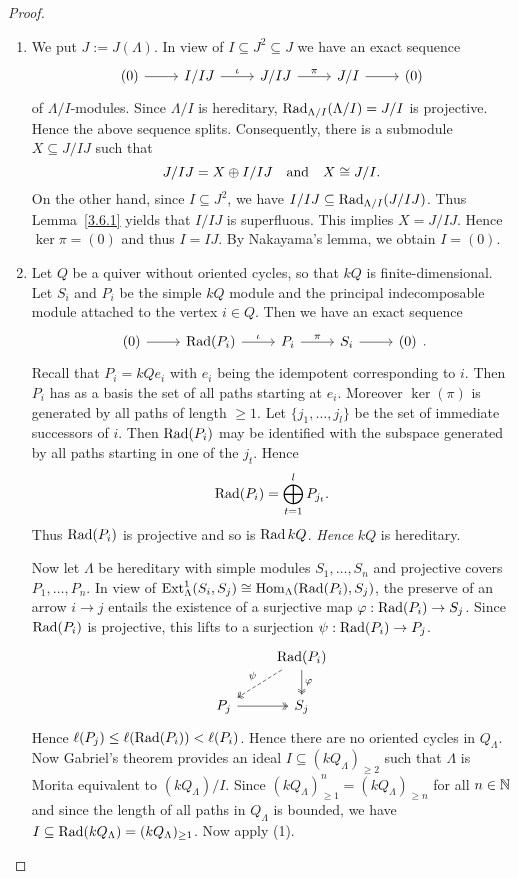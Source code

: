\begin{proof}\
\begin{enumerate}

\item We put $J:=J(\Lambda)$. In view of $I\subseteq J^2\subseteq J$ we have an exact sequence
\[
\begin{tikzcd}
	(0) \ar[r] & I/IJ \ar[r,"\iota"] & J/IJ \ar[r,"\pi"] & J/I \ar[r] & (0)
\end{tikzcd}
\]
of $\Lambda/I$-modules. Since $\Lambda/I$ is hereditary, $\operatorname{Rad}_{\Lambda/I}(\Lambda/I)=J/I$ is projective. Hence the above sequence splits. Consequently, there is a submodule $X\subseteq J/IJ$ such that
\[
J/IJ=X\oplus I/IJ
\quad\text{and}\quad
X\cong J/I.
\]
On the other hand, since $I\subseteq J^2$, we have $I/IJ\subseteq\operatorname{Rad}_{\Lambda/I}(J/IJ)$. Thus Lemma~\ref{3.6.1} yields that $I/IJ$ is superfluous. This implies $X=J/IJ$. Hence $\ker \pi=(0)$ and thus $I=IJ$. By Nakayama's lemma, we obtain $I=(0)$.

\item Let $Q$ be a quiver without oriented cycles, so that $kQ$ is finite-dimensional. Let $S_i$ and $P_i$ be the simple $kQ$ module and the principal indecomposable module attached to the vertex $i\in Q$. Then we have an exact sequence
\[
\begin{tikzcd}
	(0) \ar[r] & \Rad(P_i) \ar[r,"\iota"] & P_i \ar[r,"\pi"] & S_i \ar[r] & (0)
\end{tikzcd}.
\]
Recall that $P_i=kQe_i$ with $e_i$ being the idempotent corresponding to $i$. Then $P_i$ has as a basis the set of all paths starting at $e_i$. Moreover $\ker(\pi)$ is generated by all paths of length $\ge 1$. Let $\{j_1,\dots,j_l\}$ be the set of immediate successors of $i$. Then $\operatorname{Rad}(P_i)$ may be identified with the subspace generated by all paths starting in one of the $j_t$. Hence
\[
\operatorname{Rad}(P_i) = \bigoplus_{t=1}^l P_{j_t}.
\]
Thus $\operatorname{Rad}(P_i)$ is projective and so is $\operatorname{Rad} kQ$. \textit{Hence} $kQ$ is hereditary.

Now let $\Lambda$ be hereditary with simple modules $S_1,\dots,S_n$ and projective covers $P_1,\dots,P_n$. In view of
$\operatorname{Ext}_\Lambda^1(S_i,S_j)\cong \operatorname{Hom}_\Lambda(\operatorname{Rad}(P_i),S_j)$, the preserve of an arrow $i\to j$ entails the existence of a surjective map $\varphi:\operatorname{Rad}(P_i)\to S_j$. Since $\operatorname{Rad}(P_i)$ is projective, this lifts to a surjection $\psi:\operatorname{Rad}(P_i)\to P_j$.
\[
\begin{tikzcd}
 & \Rad(P_i) \ar[d,two heads,"\varphi"]\ar[dl,two heads,"\psi"',dashed] \\
P_j \ar[r,two heads] & S_j
\end{tikzcd}
\]
Hence $\ell(P_j)\le \ell(\operatorname{Rad}(P_i))<\ell(P_i)$. Hence there are no oriented cycles in $Q_\Lambda$. Now Gabriel's theorem provides an ideal $I\subseteq (kQ_\Lambda)_{\geq 2}$ such that $\Lambda$ is Morita equivalent to $(kQ_\Lambda)/I$. Since $(kQ_\Lambda)_{\ge 1}^n=(kQ_\Lambda)_{\geq n}$ for all $n\in\mathbb{N}$ and since the length of all paths in $Q_\Lambda$ is bounded, we have $I\subseteq \operatorname{Rad}(kQ_\Lambda)=(kQ_\Lambda)_{\ge 1}$. Now apply (1).\qedhere
\end{enumerate}
\end{proof}


